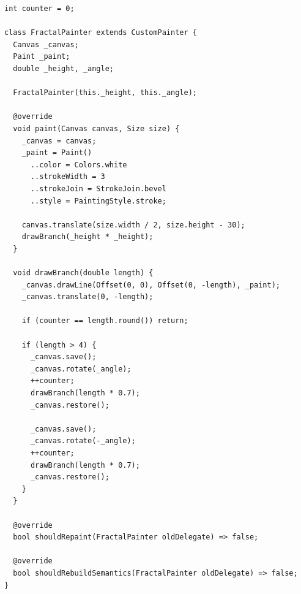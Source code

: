 \documentclass{resonance}
\begin{document}
\begin{verbatim}
int counter = 0;

class FractalPainter extends CustomPainter {
  Canvas _canvas;
  Paint _paint;
  double _height, _angle;

  FractalPainter(this._height, this._angle);

  @override
  void paint(Canvas canvas, Size size) {
    _canvas = canvas;
    _paint = Paint()
      ..color = Colors.white
      ..strokeWidth = 3
      ..strokeJoin = StrokeJoin.bevel
      ..style = PaintingStyle.stroke;

    canvas.translate(size.width / 2, size.height - 30);
    drawBranch(_height * _height);
  }

  void drawBranch(double length) {
    _canvas.drawLine(Offset(0, 0), Offset(0, -length), _paint);
    _canvas.translate(0, -length);

    if (counter == length.round()) return;

    if (length > 4) {
      _canvas.save();
      _canvas.rotate(_angle);
      ++counter;
      drawBranch(length * 0.7);
      _canvas.restore();

      _canvas.save();
      _canvas.rotate(-_angle);
      ++counter;
      drawBranch(length * 0.7);
      _canvas.restore();
    }
  }

  @override
  bool shouldRepaint(FractalPainter oldDelegate) => false;

  @override
  bool shouldRebuildSemantics(FractalPainter oldDelegate) => false;
}
	\end{verbatim}
	
\end{document}
